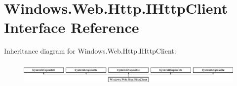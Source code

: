 \hypertarget{interface_windows_1_1_web_1_1_http_1_1_i_http_client}{}\section{Windows.\+Web.\+Http.\+I\+Http\+Client Interface Reference}
\label{interface_windows_1_1_web_1_1_http_1_1_i_http_client}
Inheritance diagram for Windows.\+Web.\+Http.\+I\+Http\+Client\+:\begin{figure}[H]
\begin{center}
\leavevmode
\includegraphics[height=1.204301cm]{interface_windows_1_1_web_1_1_http_1_1_i_http_client}
\end{center}
\end{figure}
